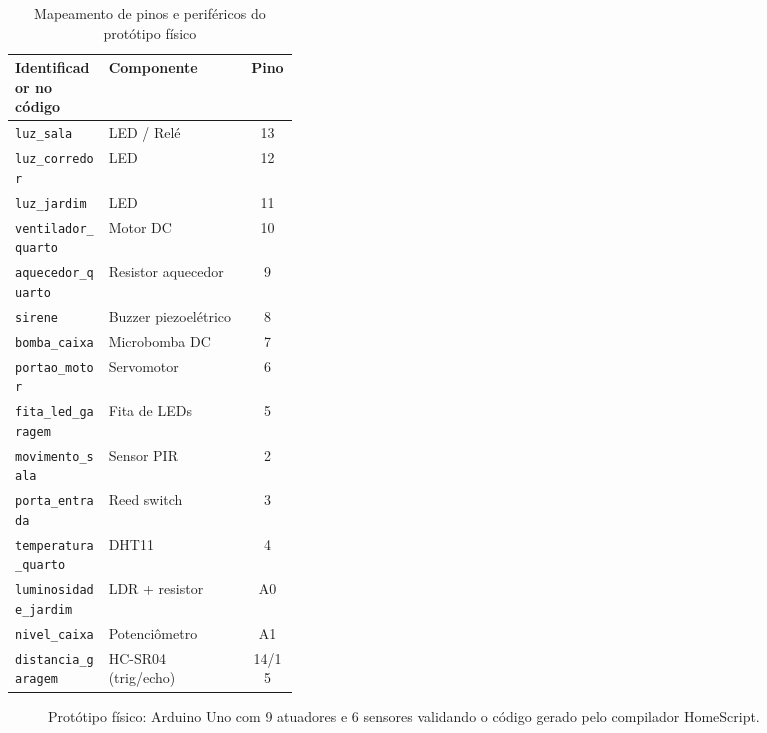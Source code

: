 \documentclass[conference]{IEEEtran}
\begin{document}
\begin{table}[htbp]
\caption{Mapeamento de pinos e periféricos do protótipo físico}
\label{tab:hardware_pins}
\centering
\begin{tabular}{p{0.33\linewidth}lc}
\toprule
\textbf{Identificador no código} & \textbf{Componente} & \textbf{Pino} \\
\midrule
\texttt{luz\_sala}          & LED / Relé         & 13 \\
\texttt{luz\_corredor}      & LED                & 12 \\
\texttt{luz\_jardim}        & LED                & 11 \\
\texttt{ventilador\_quarto} & Motor DC           & 10 \\
\texttt{aquecedor\_quarto}  & Resistor aquecedor &  9 \\
\texttt{sirene}             & Buzzer piezoelétrico & 8 \\
\texttt{bomba\_caixa}       & Microbomba DC      &  7 \\
\texttt{portao\_motor}      & Servomotor         &  6 \\
\texttt{fita\_led\_garagem} & Fita de LEDs       &  5 \\
\texttt{movimento\_sala}    & Sensor PIR         &  2 \\
\texttt{porta\_entrada}     & Reed switch        &  3 \\
\texttt{temperatura\_quarto}& DHT11              &  4 \\
\texttt{luminosidade\_jardim}& LDR + resistor    & A0 \\
\texttt{nivel\_caixa}       & Potenciômetro      & A1 \\
\texttt{distancia\_garagem} & HC-SR04 (trig/echo)& 14/15 \\
\bottomrule
\end{tabular}
\end{table}

\begin{figure}[htbp]
\centerline{%
}
\caption{Protótipo físico: Arduino Uno com 9 atuadores e 6 sensores validando o código gerado pelo compilador HomeScript.}
\label{fig:arduino}
\end{figure}
\end{document}
